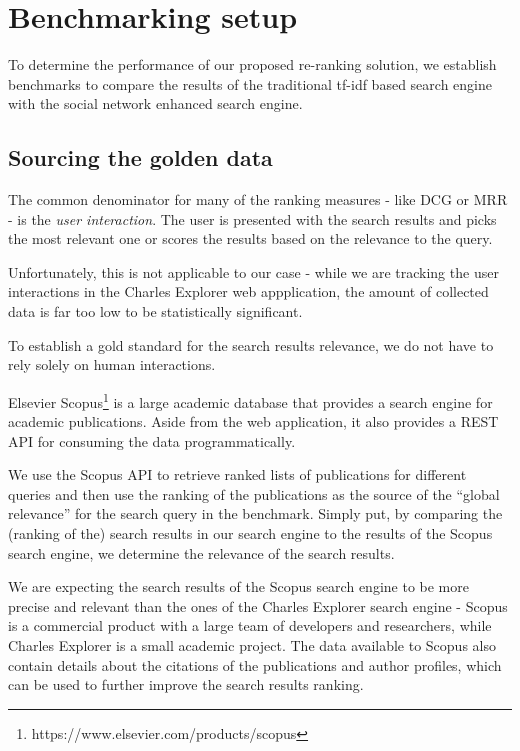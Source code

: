 \section{Benchmarking setup}

To determine the performance of our proposed re-ranking solution, we establish benchmarks to compare the results of the traditional tf-idf based search engine with the social network enhanced search engine.

\subsection{Sourcing the golden data}

The common denominator for many of the ranking measures - like \ac{DCG} or \ac{MRR} - is the \textit{user interaction}.
The user is presented with the search results and picks the most relevant one or scores the results based on the relevance to the query.

Unfortunately, this is not applicable to our case - while we are tracking the user interactions in the Charles Explorer web appplication, the amount of collected data is far too low to be statistically significant.

To establish a gold standard for the search results relevance, we do not have to rely solely on human interactions.

Elsevier Scopus\footnote{https://www.elsevier.com/products/scopus} is a large academic database that provides a search engine for academic publications.
Aside from the web application, it also provides a REST API for consuming the data programmatically.

We use the Scopus API to retrieve ranked lists of publications for different queries and then use the ranking of the publications as the source of the ``global relevance'' for the search query in the benchmark.
Simply put, by comparing the (ranking of the) search results in our search engine to the results of the Scopus search engine, we determine the relevance of the search results.

We are expecting the search results of the Scopus search engine to be more precise and relevant than the ones of the Charles Explorer search engine -
Scopus is a commercial product with a large team of developers and researchers, while Charles Explorer is a small academic project.
The data available to Scopus also contain details about the citations of the publications and author profiles, which can be used to further improve the search results ranking.

